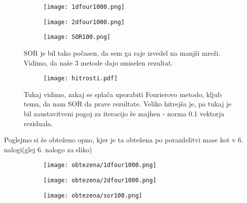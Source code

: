 \documentclass{article}
\begin{document}
\begin{figure}[H]
\centering
\begin{subfigure}{.49\textwidth}
\texttt{[image: 1dfour1000.png]}
\end{subfigure}
\begin{subfigure}{.49\textwidth}
\texttt{[image: 2dfour1000.png]}
\end{subfigure}
\caption*{}
\end{figure}

\begin{figure}[H]
\centering
\begin{subfigure}{.5\textwidth}
\texttt{[image: SOR100.png]}
\end{subfigure}
\caption*{SOR je bil tako počasen, da sem ga raje izvedel na manjši mreži. Vidimo, da naše 3 metode dajo smiselen rezultat.}
\end{figure}

\begin{figure}[H]
\centering
\begin{subfigure}{.5\textwidth}
\texttt{[image: hitrosti.pdf]}
\end{subfigure}
\caption*{Tukaj vidimo, zakaj se splača uporabiti Fourierovo metodo, kljub temu, da nam SOR da prave rezultate. Veliko hitrejša je, pa tukaj je bil zaustavitveni pogoj za iteracijo še majhen - norma 0.1 vektorja reziduala.}
\end{figure}

Poglejmo si še obteženo opno, kjer je ta obtežena po porazdelitvi mase kot v 6. nalogi(glej 6. nalogo za sliko)

\begin{figure}[H]
\centering
\begin{subfigure}{.49\textwidth}
\texttt{[image: obtezena/1dfour1000.png]}
\end{subfigure}
\begin{subfigure}{.49\textwidth}
\texttt{[image: obtezena/2dfour1000.png]}
\end{subfigure}
\caption*{}
\end{figure}

\begin{figure}[H]
\centering
\begin{subfigure}{.5\textwidth}
\texttt{[image: obtezena/sor100.png]}
\end{subfigure}
\caption*{}
\end{figure}
\end{document}

